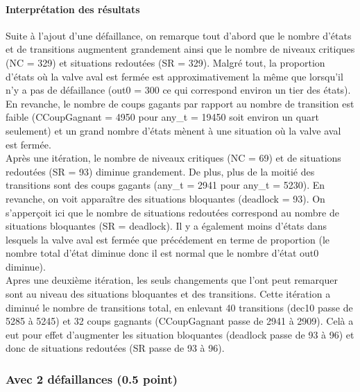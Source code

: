 \documentclass[a4paper]{book}
\begin{document}
\paragraph{Interprétation des résultats}
Suite à l'ajout d'une défaillance, on remarque tout d'abord que le nombre d'états et de transitions augmentent grandement ainsi que le nombre 
de niveaux critiques (NC = 329) et situations redoutées (SR = 329). Malgré tout, la proportion d'états où la valve aval est fermée est approximativement 
la même que lorsqu'il n'y a pas de défaillance (out0 = 300 ce qui correspond environ un tier des états). En revanche, le nombre de coups gagants par rapport 
au nombre de transition est faible (CCoupGagnant = 4950 pour any\_t = 19450 soit environ un quart seulement) et un grand nombre d'états mènent à une situation où 
la valve aval est fermée. \\
Après une itération, le nombre de niveaux critiques (NC = 69) et de situations redoutées (SR = 93) diminue grandement. De plus, plus de la moitié des transitions 
sont des coups gagants (any\_t = 2941 pour any\_t = 5230). En revanche, on voit apparaître des situations bloquantes (deadlock = 93). On s'apperçoit ici que le nombre 
de situations redoutées correspond au nombre de situations bloquantes (SR = deadlock). Il y a également moins 
d'états dans lesquels la valve aval est fermée que précédement en terme de proportion (le nombre total d'état diminue donc il est normal que le nombre d'état out0 
diminue).\\
Apres une deuxième itération, les seuls changements que l'ont peut remarquer sont au niveau des situations bloquantes et des transitions. Cette itération a diminué 
le nombre de transitions total, en enlevant 40 transitions (dec10 passe de 5285 à 5245) et 32 coups gagnants (CCoupGagnant passe de 2941 à 2909). Celà a eut pour  
effet d'augmenter les situation bloquantes (deadlock passe de 93 à 96) et donc de situations redoutées (SR passe de 93 à 96).



\subsubsection{Avec 2 défaillances (0.5 point)}





\end{document}
